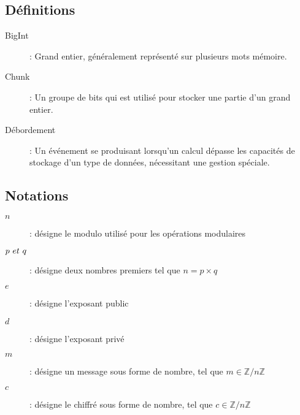 \subsection{Définitions}
\begin{description}
    \item[BigInt] : Grand entier, généralement représenté sur plusieurs mots mémoire.
    \item[Chunk] : Un groupe de bits qui est utilisé pour stocker une partie d'un grand entier.
    \item[Débordement] : Un événement se produisant lorsqu'un calcul dépasse les capacités de stockage d'un type de données, nécessitant une gestion spéciale.
\end{description}

\subsection{Notations}
\begin{description}
    \item[$n$] : désigne le modulo utilisé pour les opérations modulaires
    \item[$p~\normalfont{et}~q$] : désigne deux nombres premiers tel que $n = p \times q$
    \item[$e$] : désigne l'exposant public
    \item[$d$] : désigne l'exposant privé
    \item[$m$] : désigne un message sous forme de nombre, tel que $m \in \mathbb{Z}/n\mathbb{Z}$
    \item[$c$] : désigne le chiffré sous forme de nombre, tel que $c \in \mathbb{Z}/n\mathbb{Z}$
\end{description}

